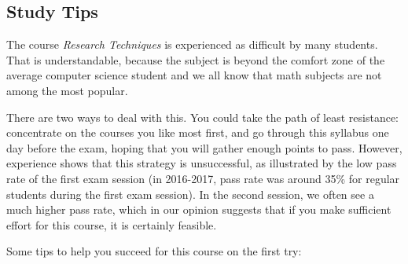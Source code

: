 \subsection{Study Tips}

The course \emph{Research Techniques} is experienced as difficult by many students. That is understandable, because the subject is beyond the comfort zone of the average computer science student and we all know that math subjects are not among the most popular.

There are two ways to deal with this. You could take the path of least resistance: concentrate on the courses you like most first, and go through this syllabus one day before the exam, hoping that you will gather enough points to pass. However, experience shows that this strategy is unsuccessful, as illustrated by the low pass rate of the first exam session (in 2016-2017, pass rate was around 35\% for regular students during the first exam session). In the second session, we often see a much higher pass rate, which in our opinion suggests that if you make sufficient effort for this course, it is certainly feasible.

Some tips to help you succeed for this course on the first try:


